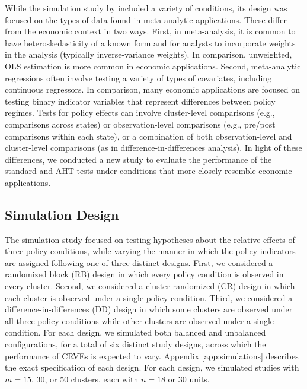 \documentclass[12pt]{article}
\begin{document}
While the simulation study by \citet{Tipton2015small-F} included a variety of conditions, its design was focused on the types of data found in meta-analytic applications. 
These differ from the economic context in two ways.
First, in meta-analysis, it is common to have heteroskedasticity of a known form and for analysts to incorporate weights in the analysis (typically inverse-variance weights).
In comparison, unweighted, OLS estimation is more common in economic applications.
Second, meta-analytic regressions often involve testing a variety of types of covariates, including continuous regressors.
In comparison, many economic applications are focused on testing binary indicator variables that represent differences between policy regimes. 
Tests for policy effects can involve cluster-level comparisons (e.g., comparisons across states) or observation-level comparisons (e.g., pre/post comparisons within each state), or a combination of both observation-level and cluster-level comparisons (as in difference-in-differences analysis).
In light of these differences, we conducted a new study to evaluate the performance of the standard and AHT tests under conditions that more closely resemble economic applications. 

\subsection{Simulation Design}

The simulation study focused on testing hypotheses about the relative effects of three policy conditions, while varying the manner in which the policy indicators are assigned following one of three distinct designs. 
First, we considered a randomized block (RB) design in which every policy condition is observed in every cluster. 
Second, we considered a cluster-randomized (CR) design in which each cluster is observed under a single policy condition. 
Third, we considered a difference-in-differences (DD) design in which some clusters are observed under all three policy conditions while other clusters are observed under a single condition. 
For each design, we simulated both balanced and unbalanced configurations, for a total of six distinct study designs, across which the performance of CRVEs is expected to vary. 
Appendix \ref{app:simulations} describes the exact specification of each design. For each design, we simulated studies with $m = 15$, 30, or 50 clusters, each with $n = 18$ or 30 units.
\end{document}
